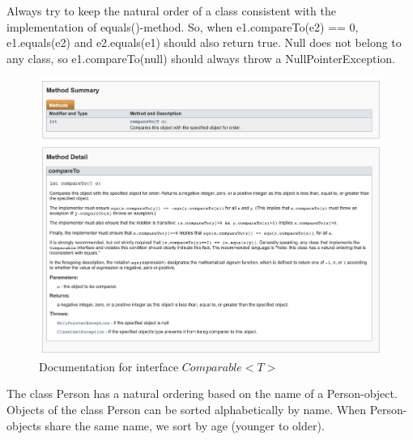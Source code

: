 Always try to keep the natural order of a class consistent with the implementation of equals()-method.  So, when e1.compareTo(e2) == 0, e1.equals(e2) and e2.equals(e1) should also return true.  Null does not belong to any class, so e1.compareTo(null) should always throw a NullPointerException.

\begin{figure}[H]
\includegraphics[width=\linewidth]{images/chapter_generics/javadoc_compareTo.png}
\caption{Documentation for interface $Comparable<T>$}
\label{fig:core_classes}
\end{figure}

The class Person has a natural ordering based on the name of a Person-object.  Objects of the class Person can be sorted alphabetically by name. When Person-objects share the same name, we sort by age (younger to older).

